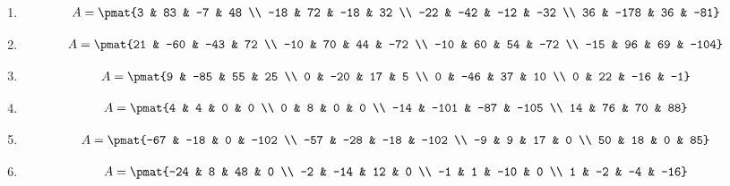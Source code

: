 \begin{enumerate}
\item

\begin{align*}
A = \pmat{3 & 83 & -7 & 48 \\ -18 & 72 & -18 & 32 \\ -22 & -42 & -12 & -32 \\ 36 & -178 & 36 & -81}
\end{align*}

\item

\begin{align*}
A = \pmat{21 & -60 & -43 & 72 \\ -10 & 70 & 44 & -72 \\ -10 & 60 & 54 & -72 \\ -15 & 96 & 69 & -104}
\end{align*}

\item

\begin{align*}
A = \pmat{9 & -85 & 55 & 25 \\ 0 & -20 & 17 & 5 \\ 0 & -46 & 37 & 10 \\ 0 & 22 & -16 & -1}
\end{align*}

\item

\begin{align*}
A = \pmat{4 & 4 & 0 & 0 \\ 0 & 8 & 0 & 0 \\ -14 & -101 & -87 & -105 \\ 14 & 76 & 70 & 88}
\end{align*}

\item

\begin{align*}
A = \pmat{-67 & -18 & 0 & -102 \\ -57 & -28 & -18 & -102 \\ -9 & 9 & 17 & 0 \\ 50 & 18 & 0 & 85}
\end{align*}

\item

\begin{align*}
A = \pmat{-24 & 8 & 48 & 0 \\ -2 & -14 & 12 & 0 \\ -1 & 1 & -10 & 0 \\ 1 & -2 & -4 & -16}
\end{align*}


\end{enumerate}
